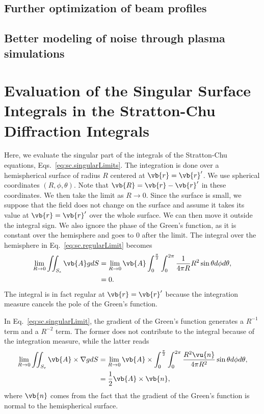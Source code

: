 \documentclass[11pt,SymmetricalJury]{inrsthesis/inrsthesis}
\begin{document}
\section{Further optimization of beam profiles}

\section{Better modeling of noise through plasma simulations}

\appendix
{}
\renewcommand{\thechapter}{\Alph{chapter}}
\renewcommand{\thesection}{\Alph{chapter}.\arabic{section}}

\chapter{Evaluation of the Singular Surface Integrals in the Stratton-Chu Diffraction Integrals}
\label{app.limits}


Here, we evaluate the singular part of the integrals of the Stratton-Chu equations,
Eqs.~\eqref{eq:sc.singularLimits}.
The integration is done over a hemispherical surface of radius $R$ centered at
$\vb{r}=\vb{r}'$. We use spherical coordinates $(R,\phi,\theta)$. Note that
$\vb{R}=\vb{r}-\vb{r}'$ in these coordinates.
We then take the limit as $R\rightarrow0$. Since the surface
is small, we suppose that the field does not change on the surface and assume
it takes its value at $\vb{r}=\vb{r}'$ over the whole surface. We can then move it
outside the integral sign. We also ignore the phase of the Green's function, as
it is constant over the hemisphere and goes to 0 after the limit.
The integral over the hemisphere in Eq.~\eqref{eq:sc.regularLimit} becomes
  \begin{align}
    \lim_{R\rightarrow0}\iint_{S_\epsilon}\vb{A}gdS
      &= \lim_{R\rightarrow0}\vb{A}\int_0^{\frac{\pi}{2}}\int_0^{2\pi}\frac{1}{4\pi R} R^2 \sin\theta d\phi d\theta,\nonumber\\
      &= 0.
  \end{align}
The integral is in fact regular at $\vb{r}=\vb{r}'$ because the integration measure
cancels the pole of the Green's function.

In Eq.~\eqref{eq:sc.singularLimit}, the gradient of the Green's function
generates a $R^{-1}$ term and a $R^{-2}$ term. The former does not contribute to the integral
because of the integration measure, while the latter reads
  \begin{align}
    \lim_{R\rightarrow0}\iint_{S_\epsilon}\vb{A}\times\nabla gdS
      &= \lim_{R\rightarrow0}\vb{A}\times
      \int_0^{\frac{\pi}{2}}\int_0^{2\pi}\frac{R^2\vu{n}}{4\pi R^2}\sin\theta d\phi d\theta, \nonumber\\
      &= \frac{1}{2}\vb{A}\times\vb{n},
  \end{align}
where $\vb{n}$ comes from the fact that the gradient of the Green's function is
normal to the hemispherical surface.
\end{document}
